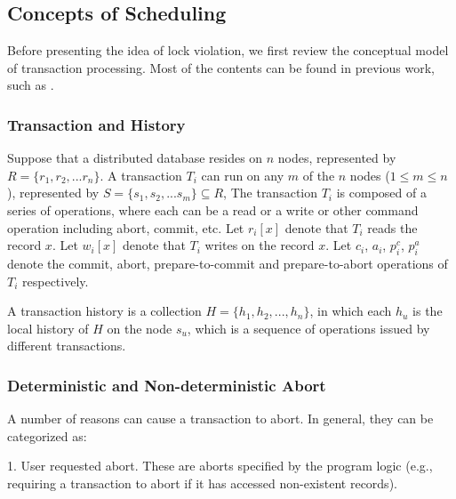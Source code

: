 \documentclass[conference]{IEEEtran}
\begin{document}
\subsection{Concepts of Scheduling}
Before presenting the idea of lock violation, we first review the conceptual model of transaction processing. Most of the contents can be found in previous work, such as \cite{LockNoWait:journals/csur/BernsteinG81}.

\subsubsection{Transaction and History}
Suppose that a distributed database resides on ${n}$ nodes, represented by ${R = \{r_1, r_2, ... r_n\}}$.
A transaction ${T_i}$ can run on any ${m}$ of the ${n}$ nodes ($1 \le m \le n$), represented by  ${S = \{s_1, s_2, ... s_m\} \subseteq R}$,
The transaction ${T_i}$ is composed of a series of operations, %
where each can be a read or a write or other command operation including abort, commit, etc.
Let ${r_i[x]}$ denote that ${T_i}$ reads the record ${x}$. Let ${w_i[x]}$ denote that ${T_i}$ writes on the record ${x}$.
Let ${c_i}$, ${a_i}$, ${p^c_i}$, ${p^a_i}$ denote the commit, abort, prepare-to-commit and prepare-to-abort operations of ${T_i}$ respectively.

A transaction history is a collection ${H = \{h_1, h_2, ..., h_n\}}$, in which
each ${h_u}$ is the local history of $H$ on the node ${s_u}$, which is a sequence of operations issued by different transactions.


\subsubsection{Deterministic and Non-deterministic Abort}
A number of reasons can cause a transaction to abort. In general, they can be categorized as:

1. User requested abort. These are aborts specified by the program logic (e.g., requiring a transaction to abort if it has accessed non-existent records).
\end{document}
